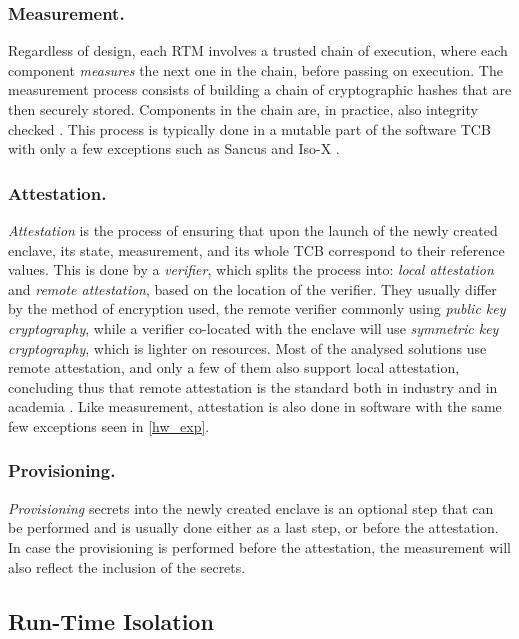 \documentclass[runningheads,a4paper]{uwsese}
\begin{document}
\subsubsection{Measurement.}

Regardless of design, each RTM involves a trusted chain of execution, where
each component \emph{measures} the next one in the chain, before passing on
execution. The measurement process consists of building a chain of
cryptographic hashes that are then securely stored. Components in the chain
are, in practice, also integrity checked \cite{tee_hw_sup}. This process is
typically done in a mutable part of the software \gls{TCB} with only a few
exceptions \label{hw_exp} such as Sancus \cite{tee_sancus} and Iso-X
\cite{tee_isox}.

\subsubsection{Attestation.}

\emph{Attestation} is the process of ensuring that upon the launch of the newly
created enclave, its state, measurement, and its whole \gls{TCB} correspond to
their reference values. This is done by a \emph{verifier}, which splits the
process into: \emph{local attestation} and \emph{remote attestation}, based on
the location of the verifier. They usually differ by the method of encryption
used, the remote verifier commonly using \emph{public key cryptography}, while
a verifier co-located with the enclave will use \emph{symmetric key
cryptography}, which is lighter on resources. Most of the analysed solutions
use remote attestation, and only a few of them also support local attestation,
concluding thus that remote attestation is the standard both in industry and in
academia \cite{tee_hw_sup}. Like measurement, attestation is also done in
software with the same few exceptions seen in \ref{hw_exp}.

\subsubsection{Provisioning.}

\emph{Provisioning} secrets into the newly created enclave is an optional step
that can be performed and is usually done either as a last step, or before the
attestation. In case the provisioning is performed before the attestation, the
measurement will also reflect the inclusion of the secrets. \cite{tee_hw_sup}

\subsection{Run-Time Isolation}
\end{document}

